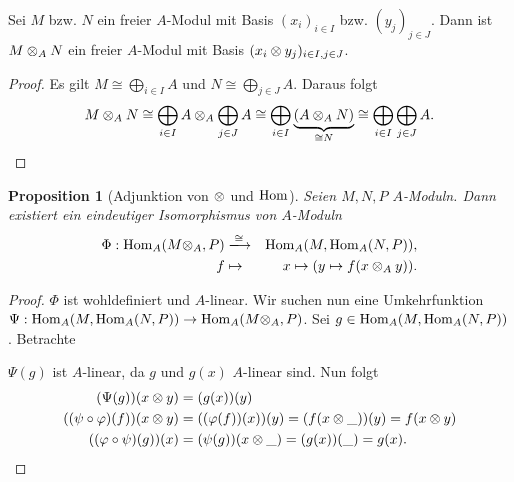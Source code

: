 \documentclass[12pt,a4paper]{scrartcl}
\theoremstyle{cplain}
\newtheorem{prop}[thmcounter]{Proposition}
\theoremstyle{cdef}
\begin{document}
\begin{kor}
	Sei $M$ bzw. $N$ ein freier $A$-Modul mit Basis $(x_i)_{i \in I}$ bzw. $(y_j)_{j\in J}$. Dann ist $M \otimes_A N$ ein freier $A$-Modul mit Basis $(x_i\otimes y_j)_{i \in I, j\in J}$.
\end{kor}
\begin{proof}
	Es gilt $M \cong \bigoplus\limits_{i\in I} A$ und $N \cong \bigoplus\limits_{j\in J} A$. Daraus folgt \[ M \otimes_A N \cong  \bigoplus_{i\in I} A \otimes_A \bigoplus_{j\in J} A \cong \bigoplus_{i \in I}\underbrace{(A \otimes_A N)}_{\cong N} \cong \bigoplus_{i\in I}\bigoplus_{j\in J}A. \qedhere \]
\end{proof}
\begin{prop}[Adjunktion von $\otimes$ und $\operatorname{Hom}$]
	Seien $M,N,P$ $A$-Moduln. Dann existiert ein eindeutiger Isomorphismus von $A$-Moduln
	\begin{eqnarray*}
		\Phi: \Hom_A (M \tp_A , P ) &\xlongrightarrow{\cong}& \Hom_A(M, \Hom_A(N, P)), \\
		f &\mapsto& x \mapsto (y \mapsto f(x \tp_A y)).
	\end{eqnarray*}
\end{prop}
\begin{proof}
	$\Phi$ ist wohldefiniert und $A$-linear. Wir suchen nun eine Umkehrfunktion $\Psi : \operatorname{Hom}_A(M, \operatorname{Hom}_A(N, P)) \to \operatorname{Hom}_A (M \otimes_A , P )$. Sei $g \in \operatorname{Hom}_A(M, \operatorname{Hom}_A(N,P))$. Betrachte
	\begin{figure}[H]
		\centering
	\end{figure}
	$\Psi(g)$ ist $A$-linear, da $g$ und $g(x)$ $A$-linear sind. Nun folgt
	\begin{align*}
		(\Psi(g))(x \otimes y) &= (g(x))(y) \\
		((\psi \circ \varphi)(f))(x \otimes y) &= ((\varphi(f))(x))(y) = (f(x \otimes \_))(y) = f(x \otimes y) \\
		((\varphi \circ \psi)(g))(x) &= (\psi(g))(x \otimes \_) = (g(x))(\_) = g(x). \qedhere
	\end{align*}
\end{proof}
\end{document}
